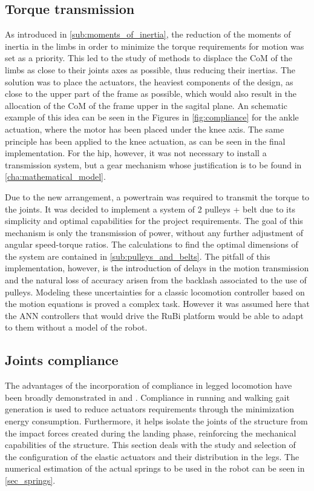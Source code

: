
\subsection{Torque transmission} %
\label{sub:transmission}
As introduced in \ref{sub:moments_of_inertia}, the reduction of the moments of inertia in the limbs in order to minimize the torque requirements for motion was set as a priority.
This led to the study of methods to displace the CoM of the limbs as close to their joints axes as possible, thus reducing their inertias.
The solution was to place the actuators, the heaviest components of the design, as close to the upper part of the frame as possible, which would also result in the allocation of the CoM of the frame upper in the sagital plane.
An schematic example of this idea can be seen in the Figures in \ref{fig:compliance} for the ankle actuation, where the motor has been placed under the knee axis. 
The same principle has been applied to the knee actuation, as can be seen in the final implementation. 
For the hip, however, it was not necessary to install a transmission system, but a gear mechanism whose justification is to be found in \ref{cha:mathematical_model}.

Due to the new arrangement, a powertrain was required to transmit the torque to the joints.
It was decided to implement a system of 2 pulleys + belt due to its simplicity and optimal capabilities for the project requirements.
The goal of this mechanism is only the transmission of power, without any further adjustment of angular speed-torque ratios.
The calculations to find the optimal dimensions of the system are contained in \ref{sub:pulleys_and_belts}.
The pitfall of this implementation, however, is the introduction of delays in the motion transmission and the natural loss of accuracy arisen from the backlash associated to the use of pulleys.
Modeling these uncertainties for a classic locomotion controller based on the motion equations is proved a complex task. 
However it was assumed here that the ANN controllers that would drive the RuBi platform would be able to adapt to them without a model of the robot.


\subsection{Joints compliance} %
\label{sub:compliance}
The advantages of the incorporation of compliance in legged locomotion have been broadly demonstrated in \cite{compliance_thesis} and \cite{grimmer}.
Compliance in running and walking gait generation is used to reduce actuators requirements through the minimization energy consumption.
Furthermore, it helps isolate the joints of the structure from the impact forces created during the landing phase, reinforcing the mechanical capabilities of the structure.
This section deals with the study and selection of the configuration of the elastic actuators and their distribution in the legs.
The numerical estimation of the actual springs to be used in the robot can be seen in \ref{sec_springs}.


